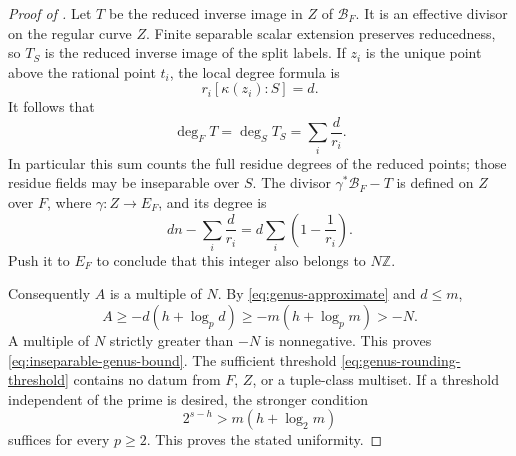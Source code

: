 \begin{proof}[Proof of ]
Let $T$ be the reduced inverse image in $Z$ of $\mathcal B_F$.
It is an effective divisor on the regular curve $Z$.
Finite separable scalar extension preserves reducedness, so $T_S$
is the reduced inverse image of the split labels.  If $z_i$ is the
unique point above the rational point $t_i$, the local degree formula
is
\[
 r_i[\kappa(z_i):S]=d.
\]
It follows that
\[
 \deg_F T=\deg_S T_S=\sum_i\frac d{r_i}.
\]
In particular this sum counts the full residue degrees of the reduced
points; those residue fields may be inseparable over $S$.
The divisor $\gamma^*\mathcal B_F-T$ is defined on $Z$ over $F$, where
$\gamma:Z\to E_F$, and its degree is
\[
 dn-\sum_i\frac d{r_i}
    =d\sum_i\left(1-\frac1{r_i}\right).
\]
Push it to $E_F$ to conclude that this integer also belongs to
$N\mathbb Z$.

Consequently $A$ is a multiple of $N$. By
\eqref{eq:genus-approximate} and $d\le m$,
\[
 A\ge-d(h+\log_p d)
      \ge-m(h+\log_p m)>-N.
\]
A multiple of $N$ strictly greater than $-N$ is nonnegative.  This
proves \eqref{eq:inseparable-genus-bound}.
The sufficient threshold \eqref{eq:genus-rounding-threshold} contains
no datum from $F$, $Z$, or a tuple-class multiset.  If a threshold
independent of the prime is desired, the stronger condition
\[
 2^{s-h}>m(h+\log_2m)
\]
suffices for every $p\ge2$.  This proves the stated uniformity.
\end{proof}
